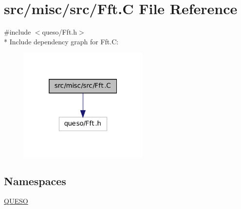 \hypertarget{_fft_8_c}{\section{src/misc/src/\-Fft.C File Reference}
\label{_fft_8_c}
}
{\ttfamily \#include $<$queso/\-Fft.\-h$>$}\\*
Include dependency graph for Fft.\-C\-:
\nopagebreak
\begin{figure}[H]
\begin{center}
\leavevmode
\includegraphics[width=184pt]{_fft_8_c__incl}
\end{center}
\end{figure}
\subsection*{Namespaces}
\begin{DoxyCompactItemize}
\item 
\hyperlink{namespace_q_u_e_s_o}{Q\-U\-E\-S\-O}
\end{DoxyCompactItemize}

